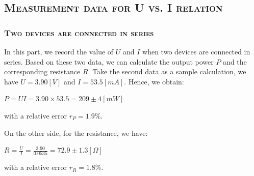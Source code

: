 \documentclass[a4paper,12pt]{article}
\begin{document}
\subsection{\textsc{Measurement data for U vs. I relation}}
\newpage
\subsubsection{\textsc{Two devices are connected in series}}
In this part, we record the value of $U$ and $I$ when two devices are connected in series. Based on these two data, we can calculate the output power $P$ and the corresponding resistance $R$. Take the second data as a sample calculation, we have $U = 3.90 [V]$ and $I = 53.5 [mA]$. Hence, we obtain:
\begin{center}
$ P = UI = 3.90 \times 53.5 = 209 \pm 4 [mW] $
\end{center}
with a relative error $r_P = 1.9\%$.
\par On the other side, for the resistance, we have:
\begin{center}
$ \displaystyle R = \frac{U}{I} = \frac{3.90}{0.0535} = 72.9 \pm 1.3 [\Omega] $
\end{center}
with a relative error $r_R = 1.8\%$.
\end{document}
